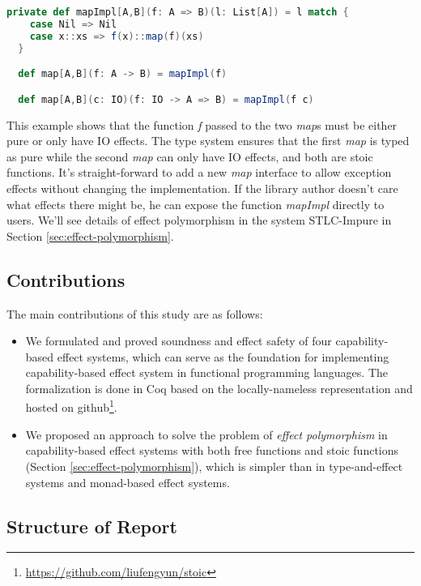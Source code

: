 \begin{lstlisting}[language=Scala]
  private def mapImpl[A,B](f: A => B)(l: List[A]) = l match {
    case Nil => Nil
    case x::xs => f(x)::map(f)(xs)
  }

  def map[A,B](f: A -> B) = mapImpl(f)

  def map[A,B](c: IO)(f: IO -> A => B) = mapImpl(f c)
\end{lstlisting}

This example shows that the function \emph{f} passed to the two
\emph{map}s must be either pure or only have IO effects. The type
system ensures that the first \emph{map} is typed as pure while the
second \emph{map} can only have IO effects, and both are stoic
functions. It's straight-forward to add a new \emph{map} interface to
allow exception effects without changing the implementation. If the
library author doesn't care what effects there might be, he can expose
the function \emph{mapImpl} directly to users.  We'll see details of
effect polymorphism in the system STLC-Impure in Section
\ref{sec:effect-polymorphism}.

\subsection{Contributions}

The main contributions of this study are as follows:

\begin{itemize}
\item We formulated and proved soundness and effect safety of four
  capability-based effect systems, which can serve as the foundation
  for implementing capability-based effect system in functional
  programming languages. The formalization is done in Coq based on the
  locally-nameless representation\cite{chargueraud-11-ln} and hosted
  on github\footnote{\url{https://github.com/liufengyun/stoic}}.
\item We proposed an approach to solve the problem of \emph{effect
    polymorphism} in capability-based effect systems with both free
  functions and stoic functions (Section
  \ref{sec:effect-polymorphism}), which is simpler than in
  type-and-effect systems and monad-based effect systems.
\end{itemize}

\subsection{Structure of Report}

